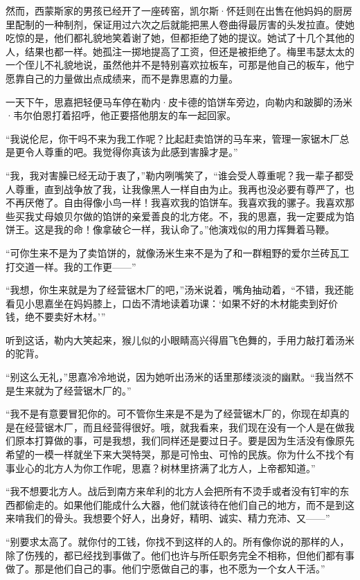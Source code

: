 \par 然而，西蒙斯家的男孩已经开了一座砖窑，凯尔斯·怀廷则在出售在他妈妈的厨房里配制的一种制剂，保证用过六次之后就能把黑人卷曲得最厉害的头发拉直。使她吃惊的是，他们都礼貌地笑着谢了她，但都拒绝了她的提议。她试了十几个其他的人，结果也都一样。她孤注一掷地提高了工资，但还是被拒绝了。梅里韦瑟太太的一个侄儿不礼貌地说，虽然他并不是特别喜欢拉板车，可那是他自己的板车，他宁愿靠自己的力量做出点成绩来，而不是靠思嘉的力量。
\par 一天下午，思嘉把轻便马车停在勒内·皮卡德的馅饼车旁边，向勒内和跛脚的汤米·韦尔伯恩打着招呼，他正要搭他朋友的车一起回家。
\par “我说伦尼，你干吗不来为我工作呢？比起赶卖馅饼的马车来，管理一家锯木厂总是更令人尊重的吧。我觉得你真该为此感到害臊才是。”
\par “我，我对害臊已经无动于衷了，”勒内咧嘴笑了，“谁会受人尊重呢？我一辈子都受人尊重，直到战争放了我，让我像黑人一样自由为止。我再也没必要有尊严了，也不再厌倦了。自由得像小鸟一样！我喜欢我的馅饼车。我喜欢我的骡子。我喜欢那些买我丈母娘贝尔做的馅饼的亲爱善良的北方佬。不，我的思嘉，我一定要成为馅饼王。这是我的命！像拿破仑一样，我认命了。”他演戏似的用力挥舞着马鞭。
\par “可你生来不是为了卖馅饼的，就像汤米生来不是为了和一群粗野的爱尔兰砖瓦工打交道一样。我的工作更——”
\par “我想，你生来就是为了经营锯木厂的吧，”汤米说着，嘴角抽动着，“不错，我还能看见小思嘉坐在妈妈膝上，口齿不清地读着功课：‘如果不好的木材能卖到好价钱，绝不要卖好木材。'”
\par 听到这话，勒内大笑起来，猴儿似的小眼睛高兴得眉飞色舞的，手用力敲打着汤米的驼背。
\par “别这么无礼，”思嘉冷冷地说，因为她听出汤米的话里那缕淡淡的幽默。“我当然不是生来就为了经营锯木厂的。”
\par “我不是有意要冒犯你的。可不管你生来是不是为了经营锯木厂的，你现在却真的是在经营锯木厂，而且经营得很好。哦，就我看来，我们现在没有一个人是在做我们原本打算做的事，可是我想，我们同样还是要过日子。要是因为生活没有像原先希望的一模一样就坐下来大哭特哭，那是可怜虫、可怜的民族。你为什么不找个有事业心的北方人为你工作呢，思嘉？树林里挤满了北方人，上帝都知道。”
\par “我不想要北方人。战后到南方来牟利的北方人会把所有不烫手或者没有钉牢的东西都偷走的。如果他们能成什么大器，他们就该待在他们自己的地方，而不是到这来啃我们的骨头。我想要个好人，出身好，精明、诚实、精力充沛、又——”
\par “别要求太高了。就你付的工钱，你找不到这样的人的。所有像你说的那样的人，除了伤残的，都已经找到事做了。他们也许与所任职务完全不相称，但他们都有事做了。那是他们自己的事。他们宁愿做自己的事，也不愿为一个女人干活。”
